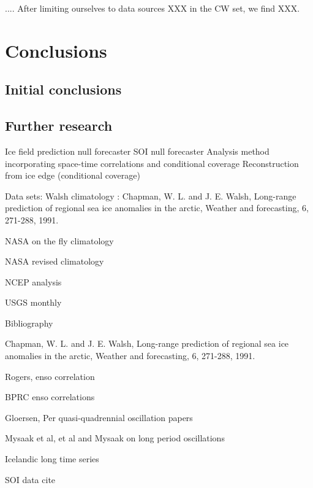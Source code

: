 ....
After limiting ourselves to data sources XXX in the CW set, we find XXX.

  

\section{Conclusions}

\subsection{Initial conclusions}

\subsection{Further research}
Ice field prediction null forecaster
SOI null forecaster
Analysis method incorporating space-time correlations and conditional coverage
Reconstruction from ice edge (conditional coverage)


  

Data sets:
  Walsh climatology : Chapman, W. L. and J. E. Walsh, Long-range prediction
of regional sea ice anomalies in the arctic, Weather and forecasting, 6,
271-288, 1991.
 
  NASA on the fly climatology

  NASA revised climatology

  NCEP analysis

  USGS monthly
 

 

\pagebreak
Bibliography

 Chapman, W. L. and J. E. Walsh, Long-range prediction
of regional sea ice anomalies in the arctic, Weather and forecasting, 6,
271-288, 1991.

Rogers, enso correlation

BPRC enso correlations

Gloersen, Per quasi-quadrennial oscillation papers

Mysaak et al, et al and Mysaak on long period oscillations

Icelandic long time series

SOI data cite



